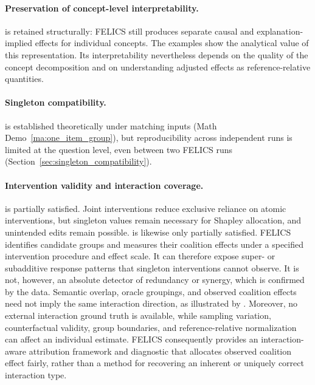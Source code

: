 \paragraph{Preservation of concept-level interpretability.}
 is retained structurally: FELICS still produces separate causal and explanation-implied effects for individual concepts. The examples show the analytical value of this representation. Its interpretability nevertheless depends on the quality of the concept decomposition and on understanding adjusted effects as reference-relative quantities.

\paragraph{Singleton compatibility.}
 is established theoretically under matching inputs (Math Demo~\ref{ma:one_item_group}), but reproducibility across independent runs is limited at the question level, even between two FELICS runs (Section~\ref{sec:singleton_compatibility}).

\paragraph{Intervention validity and interaction coverage.}
 is partially satisfied. Joint interventions reduce exclusive reliance on atomic interventions, but singleton values remain necessary for Shapley allocation, and unintended edits remain possible.  is likewise only partially satisfied. FELICS identifies candidate groups and measures their coalition effects under a specified intervention procedure and effect scale. It can therefore expose super- or subadditive response patterns that singleton interventions cannot observe. It is not, however, an absolute detector of redundancy or synergy, which is confirmed by the data. Semantic overlap, oracle groupings, and observed coalition effects need not imply the same interaction direction, as illustrated by . Moreover, no external interaction ground truth is available, while sampling variation, counterfactual validity, group boundaries, and reference-relative normalization can affect an individual estimate. FELICS consequently provides an interaction-aware attribution framework and diagnostic that allocates observed coalition effect fairly, rather than a method for recovering an inherent or uniquely correct interaction type.

